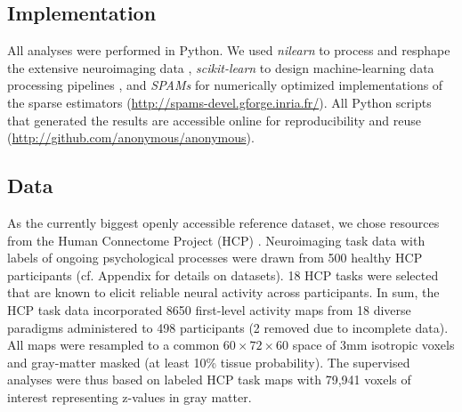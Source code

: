 \documentclass{article}
\begin{document}
\subsection{Implementation}
All analyses were performed in Python.
We used \textit{nilearn} to process and resphape
the extensive neuroimaging data 
\cite{abrah14},
\textit{scikit-learn} to design machine-learning
data processing pipelines
\cite{pedr11},
and
\textit{SPAMs} for numerically optimized
implementations of the sparse estimators
(\url{http://spams-devel.gforge.inria.fr/}).
All Python scripts that generated the results are
accessible online for reproducibility and reuse
(\url{http://github.com/anonymous/anonymous}).
  

%
\subsection{Data}
As the currently biggest openly accessible reference dataset,
we chose resources from the Human Connectome Project (HCP)
\cite{barch2013}.
Neuroimaging task data with labels of ongoing psychological processes
were drawn from 500
healthy HCP participants (cf. Appendix for details on datasets).
18 HCP tasks 
were selected that are known to elicit reliable neural activity
across participants.
In sum, the HCP task data incorporated 8650 first-level activity maps
from 18 diverse paradigms administered to 498 participants (2 removed
due to incomplete data).
All maps were resampled to a common $60\times72\times60$ space of
3mm isotropic voxels and gray-matter masked (at least 10\% tissue
probability).
The supervised analyses were thus based on labeled HCP task maps with
79,941 voxels of interest representing z-values in gray matter.
\end{document}
